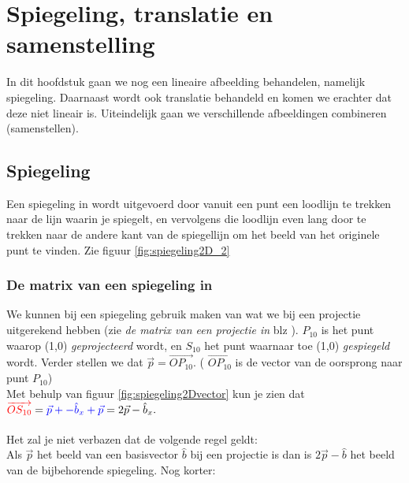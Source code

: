 \chapter{Spiegeling, translatie en samenstelling}
\label{chap: Spiegeling, translatie en samenstelling}
In dit hoofdstuk gaan we nog een lineaire afbeelding behandelen, namelijk spiegeling. Daarnaast wordt ook translatie behandeld en komen we erachter dat deze niet lineair is. Uiteindelijk gaan we verschillende afbeeldingen combineren (samenstellen).

\section{Spiegeling}
Een spiegeling in \RT wordt uitgevoerd door vanuit een punt een loodlijn te trekken naar de lijn waarin je spiegelt, en vervolgens die loodlijn even lang door te trekken naar de andere kant van de spiegellijn om het beeld van het originele punt te vinden. Zie figuur \ref{fig:spiegeling2D_2}

\subsection{De matrix van een spiegeling in \RT}
  We kunnen bij een spiegeling gebruik maken van wat we bij een projectie uitgerekend hebben (zie 
\textit{de matrix van een projectie in \RT} blz \pageref{projectie2D}). $ P_{10}  $ is het punt waarop (1,0) \textit{geprojecteerd} wordt, en $ S_{10}  $ het punt  waarnaar toe (1,0) \textit{gespiegeld} wordt. Verder stellen we dat 
$\vec{p} = \overrightarrow{OP_{10} }. $ ( $\overrightarrow{OP_{10}} $ is de vector van de oorsprong naar punt $P_{10}$) \\ 
Met behulp van figuur \ref{fig:spiegeling2Dvector} kun je zien dat 
$  {\color{red} \overrightarrow{OS_{10} } }
=  {\color{blue} \vec{p}  + - \hat{b}_x+  \vec{p} }
= 2 \vec{p}  - \hat{b}_x. $ \\ \\
Het zal je  niet verbazen dat de volgende regel geldt:\\
Als $\vec{p} $ het beeld van een basisvector $ \hat{b}  $  bij een projectie is dan is $ 2 \vec{p}  - \hat{b} $ het beeld van de bijbehorende spiegeling. Nog korter: \\ \\

